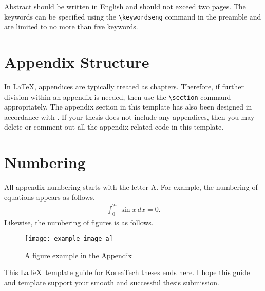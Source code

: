 \documentclass[bfive,twoside,eng]{koreatechthesis}
\theoremstyle{plain}
\begin{document}

\begin{abstracteng}
	Abstract should be written in English and should not exceed two pages.
	The keywords can be specified using the \verb|\keywordseng| command in the preamble and are limited to no more than five keywords.
\end{abstracteng}




\begin{appendixformatted}
	\section{Appendix Structure}
	In \LaTeX, appendices are typically treated as chapters. Therefore, if further division within an appendix is needed, then use the \verb|\section| command appropriately.
	The appendix section in this template has also been designed in accordance with \cite{ThesisGuide}.
	If your thesis does not include any appendices, then you may delete or comment out all the appendix-related code in this template.
	
	\section{Numbering}
	All appendix numbering starts with the letter A.
	For example, the numbering of equations appears as follows.
	\begin{align}
		\int_0^{2\pi} \sin x \,dx = 0.
	\end{align}
	Likewise, the numbering of figures is as follows.
	\begin{figure*}[h]
		\centering%
		\texttt{[image: example-image-a]}
		\caption{A figure example in the Appendix}
	\end{figure*}
	
	This \LaTeX~template guide for KoreaTech theses ends here.
	I hope this guide and template support your smooth and successful thesis submission.
\end{appendixformatted}
\end{document}
